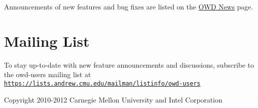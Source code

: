 Announcements of new features and bug fixes are listed on the \hyperlink{news}{O\-W\-D News} page.\hypertarget{index_owdusers}{}\section{Mailing List}\label{index_owdusers}
To stay up-\/to-\/date with new feature announcements and discussions, subscribe to the owd-\/users mailing list at \href{https://lists.andrew.cmu.edu/mailman/listinfo/owd-users}{\tt https\-://lists.\-andrew.\-cmu.\-edu/mailman/listinfo/owd-\/users}

\begin{DoxyVerb}Copyright 2010-2012 Carnegie Mellon University and Intel Corporation
\end{DoxyVerb}
 